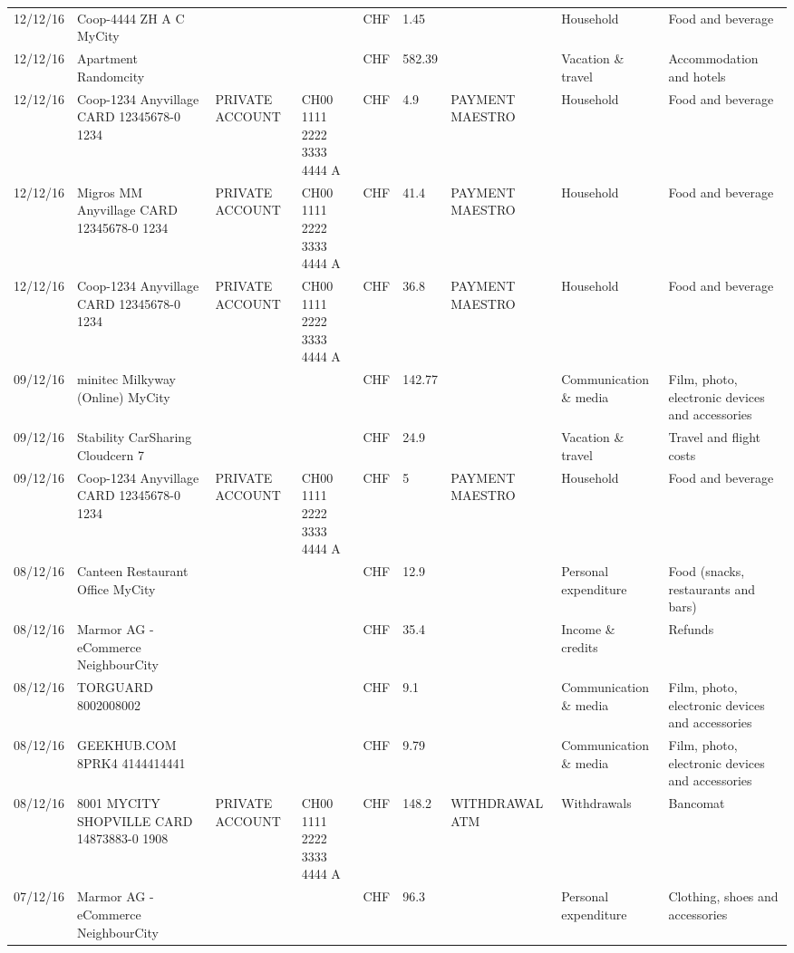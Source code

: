 \begin{landscape}
\begin{adjustwidth}{-2cm}{-2cm}
\begin{tiny}
\begin{longtable}{lp{4cm}llllp{3cm}ll}
		12/12/16 & Coop-4444 ZH A C   MyCity &       &       & CHF   & 1.45  &       & Household & Food and beverage \\
		12/12/16 & Apartment               Randomcity &       &       & CHF   & 582.39 &       & Vacation \& travel & Accommodation and hotels \\
		12/12/16 & Coop-1234 Anyvillage CARD 12345678-0 1234 & PRIVATE ACCOUNT & CH00 1111 2222 3333 4444 A & CHF   & 4.9   & PAYMENT MAESTRO & Household & Food and beverage \\
		12/12/16 & Migros MM Anyvillage CARD 12345678-0 1234 & PRIVATE ACCOUNT & CH00 1111 2222 3333 4444 A & CHF   & 41.4  & PAYMENT MAESTRO & Household & Food and beverage \\
		12/12/16 & Coop-1234 Anyvillage CARD 12345678-0 1234 & PRIVATE ACCOUNT & CH00 1111 2222 3333 4444 A & CHF   & 36.8  & PAYMENT MAESTRO & Household & Food and beverage \\
		09/12/16 & minitec Milkyway (Online) MyCity &       &       & CHF   & 142.77 &       & Communication \& media & Film, photo, electronic devices and accessories \\
		09/12/16 & Stability CarSharing      Cloudcern 7 &       &       & CHF   & 24.9  &       & Vacation \& travel & Travel and flight costs \\
		09/12/16 & Coop-1234 Anyvillage CARD 12345678-0 1234 & PRIVATE ACCOUNT & CH00 1111 2222 3333 4444 A & CHF   & 5     & PAYMENT MAESTRO & Household & Food and beverage \\
		08/12/16 & Canteen Restaurant Office      MyCity &       &       & CHF   & 12.9  &       & Personal expenditure & Food (snacks, restaurants and bars) \\
		08/12/16 & Marmor AG - eCommerce     NeighbourCity &       &       & CHF   & 35.4  &       & Income \& credits & Refunds \\
		08/12/16 & TORGUARD                 8002008002 &       &       & CHF   & 9.1   &       & Communication \& media & Film, photo, electronic devices and accessories \\
		08/12/16 & GEEKHUB.COM  8PRK4        4144414441 &       &       & CHF   & 9.79  &       & Communication \& media & Film, photo, electronic devices and accessories \\
		08/12/16 & 8001 MYCITY SHOPVILLE CARD 14873883-0 1908 & PRIVATE ACCOUNT & CH00 1111 2222 3333 4444 A & CHF   & 148.2 & WITHDRAWAL ATM & Withdrawals & Bancomat \\
		07/12/16 & Marmor AG - eCommerce     NeighbourCity &       &       & CHF   & 96.3  &       & Personal expenditure & Clothing, shoes and accessories \\

\end{longtable}
\end{tiny}
\end{adjustwidth}
\end{landscape}
